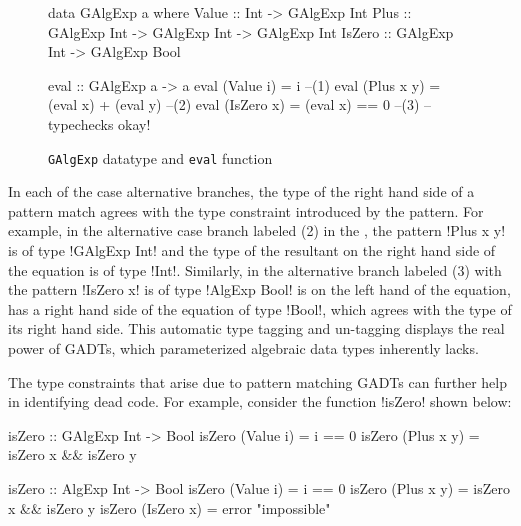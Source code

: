 \documentclass[screen,nonacm]{acmart}
\begin{document}
\begin{figure}[ht]
\centering
\begin{minipage}[ht]{0.6\linewidth}
\begin{CenteredBox}
\begin{code}
data GAlgExp a where
  Value  :: Int                        -> GAlgExp Int
  Plus   :: GAlgExp Int -> GAlgExp Int -> GAlgExp Int
  IsZero :: GAlgExp Int                -> GAlgExp Bool
\end{code}
\end{CenteredBox}
\end{minipage}%
\begin{minipage}[ht]{0.4\linewidth}
\begin{CenteredBox}
\begin{code}
eval :: GAlgExp a -> a
eval (Value i) = i                    --(1)
eval (Plus x y) = (eval x) + (eval y) --(2)
eval (IsZero x) = (eval x) == 0       --(3)
                   -- typechecks okay!
\end{code}
\end{CenteredBox}
\end{minipage}%
\caption{\texttt{GAlgExp} datatype and \texttt{eval} function}
\label{fig:galgexp-eval}
\end{figure}

In each of the case alternative branches, the type of the right hand side of a
pattern match agrees with the type constraint introduced by the
pattern. For example, in the alternative case branch labeled (2)
in the , the
pattern !Plus x y! is of type !GAlgExp Int! and the type of the
resultant on the right hand side of the equation is of type !Int!.
Similarly, in the alternative branch labeled (3) with the pattern
!IsZero x! is of type !AlgExp Bool! is on the left hand of the
equation, has a right hand side of the equation
of type !Bool!, which agrees with the type of its right hand side.
This automatic type tagging and un-tagging displays the real power
of GADTs, which parameterized algebraic data types inherently lacks.

The type constraints that arise due to pattern matching GADTs can
further help in identifying dead code\cite{xi_dead_1998,graf_lower_2020}.
For example, consider the function !isZero! shown below:

\begin{minipage}[ht]{0.5\linewidth}
\begin{CenteredBox}
\begin{code}
isZero :: GAlgExp Int -> Bool
isZero (Value i) = i == 0
isZero (Plus x y) = isZero x && isZero y
\end{code}
\end{CenteredBox}
\end{minipage}%
\begin{minipage}{0.5\linewidth}
\begin{CenteredBox}
\begin{code}
isZero :: AlgExp Int -> Bool
isZero (Value i) = i == 0
isZero (Plus x y) = isZero x && isZero y
isZero (IsZero x) = error "impossible"
\end{code}
\end{CenteredBox}
\end{minipage}
\end{document}
